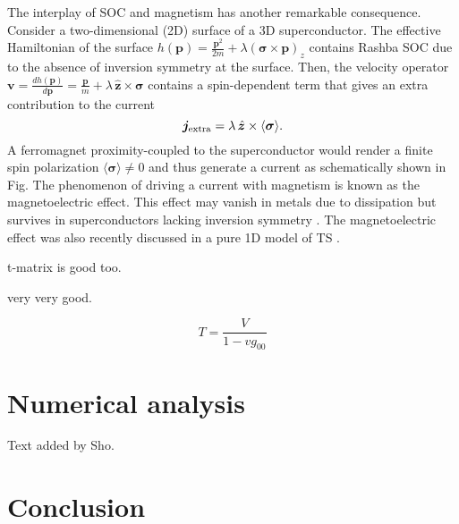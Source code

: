 \documentclass[twocolumn,showpacs,floatfix,nofootinbib,longbibliography]{revtex4-1}
\begin{document}
The interplay of SOC and magnetism has another remarkable consequence. Consider a two-dimensional (2D) surface of a 3D superconductor. The effective Hamiltonian of the surface $h(\bm p) = \frac{{\bm p}^2}{2m} + \lambda\left( \bm\sigma\times\bm p\right)_z$ contains Rashba SOC due to the absence of inversion symmetry at the surface. Then, the velocity operator $\bm v= {\frac{dh(\bm p)}{d\bm p} =\frac{\bm p}{m}+ \lambda \,\hat{\bm z}\times\bm\sigma}$ contains a spin-dependent term that gives an extra contribution to the current
\begin{equation}
	\bm j_{\rm extra} = \lambda\,  \hat{\bm z}\times\langle\bm\sigma\rangle . \label{main}
\end{equation}
A ferromagnet proximity-coupled to the superconductor would render a finite spin polarization $\langle \bm \sigma \rangle \neq 0$ and thus generate a current as schematically shown in Fig. The phenomenon of driving a current with magnetism is known as the magnetoelectric effect. This effect may vanish in metals due to dissipation but survives in superconductors lacking inversion symmetry \cite{Levitov1985, Edelstein1989, Edelstein1995, Yip2001, BauerSigrist2012}. The magnetoelectric effect was also recently discussed in a pure 1D model of TS \cite{Ojanen2012}. 

t-matrix is good too.

very very good.

\begin{equation}
 T = \frac{V}{1-vg_{00}}
\end{equation}

\section{Numerical analysis} \label{sec:numerics}
Text added by Sho.


\section{Conclusion} \label{sec:conclusion}




\newpage
%

\end{document}
